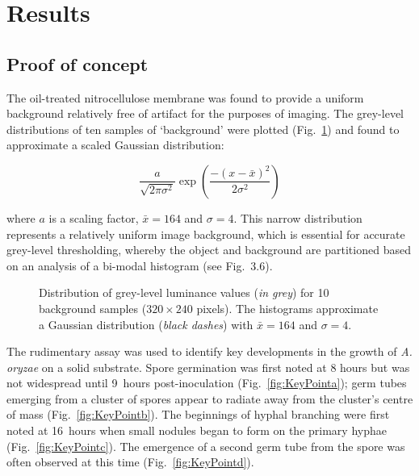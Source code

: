 \section{Results}

\subsection{Proof of concept}

The oil-treated nitrocellulose membrane was found to provide a uniform background relatively free of artifact for the purposes of imaging. The grey-level distributions of ten samples of \lq background' were plotted (Fig.~\ref{fig:BackgroundDist}) and found to approximate a scaled Gaussian distribution:

\begin{equation}
	\frac{a}{\sqrt{2 \pi \sigma^2}} \exp \left( \frac{-(x-\bar{x})^2}{2 \sigma^2} \right)
\end{equation}

\noindent where $a$ is a scaling factor, $\bar{x}=164$ and $\sigma=4$. This narrow distribution represents a relatively uniform image background, which is essential for accurate grey-level thresholding, whereby the object and background are partitioned based on an analysis of a bi-modal histogram (see Fig.~3.6).

\begin{figure}[htbp]
	\centering
	\caption{Distribution of grey-level luminance values (\emph{in grey}) for 10 background samples ($320 \times 240$ pixels). The histograms approximate a Gaussian distribution (\emph{black dashes}) with $\bar{x} = 164$ and $\sigma = 4$.}
	\label{fig:BackgroundDist}
\end{figure}

The rudimentary assay was used to identify key developments in the growth of \emph{A. oryzae} on a solid substrate. Spore germination was first noted at 8 hours but was not widespread until 9~hours post-inoculation (Fig.~\ref{fig:KeyPointa}); germ tubes emerging from a cluster of spores appear to radiate away from the cluster's centre of mass (Fig.~\ref{fig:KeyPointb}). The beginnings of hyphal branching were first noted at 16~hours when small nodules began to form on the primary hyphae (Fig.~\ref{fig:KeyPointc}). The emergence of a second germ tube from the spore was often observed at this time (Fig.~\ref{fig:KeyPointd}).

